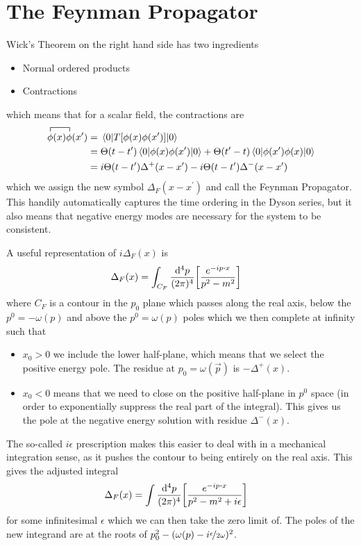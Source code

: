 \documentclass[notes.tex]{subfiles}
\begin{document}
\section{The Feynman Propagator}\label{sec:rqft_interactions_feynman-prop}
Wick's Theorem on the right hand side has two ingredients
\begin{itemize}
	\item Normal ordered products
	\item Contractions
\end{itemize}
which means that for a scalar field, the contractions are
\begin{align*}
	\contraction{}{\phi}{(x)}{\phi}\phi(x)\phi(x^\prime) &= \mel{0}{T\qty[\phi(x)\phi(x^\prime)]}{0}\\
	&= \Theta(t-t^\prime)\expval{\phi(x)\phi(x^\prime)}{0} + \Theta(t^\prime-t)\expval{\phi(x^\prime)\phi(x)}{0}\\
	&= i\Theta(t-t^\prime)\Delta^+(x-x^\prime) - i\Theta(t-t^\prime)\Delta^-(x-x^\prime)
\end{align*}
which we assign the new symbol $\Delta_F(x-x^\prime)$ and call the Feynman Propagator.
This handily automatically captures the time ordering in the Dyson series, but it also means that negative energy modes are necessary for the system to be consistent.

A useful representation of $i\Delta_F(x)$ is 
\begin{align*}
	\Delta_F(x) &= \int_{C_F} \frac{\dd[4]{p}}{(2\pi)^4}\qty[\frac{e^{-ip\vdot{x}}}{p^2 - m^2}]
\end{align*}
where $C_F$ is a contour in the $p_0$ plane which passes along the real axis, below the $p^0 = -\omega(p)$ and above the $p^0=\omega(p)$ poles which we then complete at infinity such that 
\begin{itemize}
	\item $x_0>0$ we include the lower half-plane, which means that we select the positive energy pole.
	The residue at $p_0 = \omega(\vec{p})$ is $-\Delta^+(x)$.
	\item $x_0 < 0$ means that we need to close on the positive half-plane in $p^0$ space (in order to exponentially suppress the real part of the integral). This gives us the pole at the negative energy solution with residue $\Delta^-(x)$.
\end{itemize}

The so-called $i\epsilon$ prescription makes this easier to deal with in a mechanical integration sense, as it pushes the contour to being entirely on the real axis.
This gives the adjusted integral
\begin{align*}
	\Delta_F(x) &= \int\frac{\dd[4]{p}}{(2\pi)^4} \qty[\frac{e^{-ip\vdot{x}}}{p^2 - m^2 + i\epsilon}]
\end{align*}
for some infinitesimal $\epsilon$ which we can then take the zero limit of. 
The poles of the new integrand are at the roots of $p_0^2 - (\omega(p) - i\nicefrac{\epsilon}{2\omega})^2$.
\end{document}
